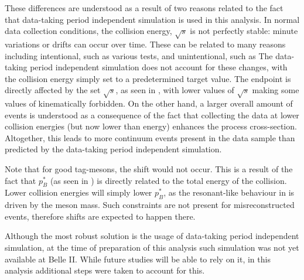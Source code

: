 These differences are understood as a result of two reasons related to the fact that data-taking period independent simulation is used in this analysis.
In normal data collection conditions, the collision energy, $\sqrt{s}$ is not perfectly stable: minute variations or drifts can occur over time.
These can be related to many reasons including intentional, such as various tests, and unintentional, such as 
The data-taking period independent simulation does not account for these changes, with the collision energy simply set to a predetermined target value.
The \Mbc endpoint is directly affected by the set $\sqrt{s}$, as seen in , with lower values of $\sqrt{s}$ making some values of \Mbc kinematically forbidden.
On the other hand, a larger overall amount of \qqbar events is understood as a consequence of the fact that collecting the data at lower collision energies (but now lower than \FourS energy) enhances the \epem\ra\qqbar process cross-section.
Altogether, this leads to more continuum events present in the data sample than predicted by the data-taking period independent simulation.

Note that for good tag-\B mesons, the shift would not occur.
This is a result of the fact that $p_B^*$ (as seen in ) is directly related to the total energy of the collision.
Lower collision energies will simply lower $p_B^*$, as the resonant-like behaviour in \Mbc is driven by the \B meson mass.
Such constraints are not present for misreconstructed events, therefore shifts are expected to happen there.

Although the most robust solution is the usage of data-taking period independent simulation, at the time of preparation of this analysis such simulation was not yet available at Belle II.
While future studies will be able to rely on it, in this analysis additional steps were taken to account for this.

